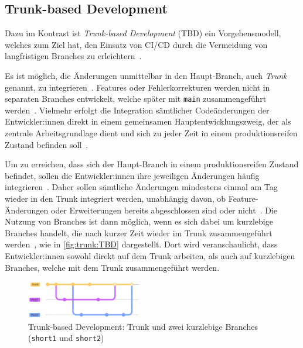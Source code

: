 
\subsection{Trunk-based Development}
\label{sec:workflows:trunk} 

Dazu im Kontrast ist \emph{Trunk-based Development} (TBD) ein Vorgehensmodell, welches zum Ziel hat, den Einsatz von CI/CD durch die Vermeidung von langfristigen Branches zu erleichtern~\cite{trunkbased6}.

Es ist möglich, die Änderungen unmittelbar in den Haupt\hyp Branch, auch \emph{Trunk} genannt, zu integrieren~\cite{trunkbased2}. Features oder Fehlerkorrekturen werden nicht in separaten Branches entwickelt, welche später mit \texttt{main} zusammengeführt werden~\cite{trunkbased2}. Vielmehr erfolgt die Integration sämtlicher Codeänderungen der Entwickler:innen direkt in einem gemeinsamen Hauptentwicklungszweig, der als zentrale Arbeitsgrundlage dient und sich zu jeder Zeit in einem produktionsreifen Zustand befinden soll~\cite{trunkbased1}.

Um zu erreichen, dass sich der Haupt\hyp Branch in einem produktionsreifen Zustand befindet, sollen die Entwickler:innen ihre jeweiligen Änderungen häufig integrieren~\cite{trunkbased2}. Daher sollen sämtliche Änderungen mindestens einmal am Tag wieder in den Trunk integriert werden, unabhängig davon, ob Feature\hyp Änderungen oder Erweiterungen bereits abgeschlossen sind oder nicht~\cite{trunkbased3}. Die Nutzung von Branches ist dann möglich, wenn es sich dabei um kurzlebige Branches handelt, die nach kurzer Zeit wieder im Trunk zusammengeführt werden~\cite{trunkbased7}, wie in \autoref{fig:trunk:TBD} dargestellt. Dort wird veranschaulicht, dass Entwickler:innen sowohl direkt auf dem Trunk arbeiten, als auch auf kurzlebigen Branches, welche mit dem Trunk zusammengeführt werden.

\begin{figure}
    \includegraphics[width=0.45\textwidth]{src/assets/diagrams/trunk/trunk.pdf}
    \caption{Trunk-based Development: Trunk und zwei kurzlebige Branches (\texttt{short1} und \texttt{short2})}
    \label{fig:trunk:TBD}
\end{figure}


